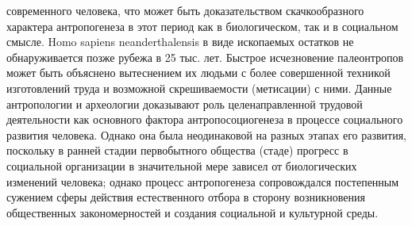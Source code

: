 \documentclass[12pt]{article}
\begin{document}
современного  человека,  что  может  быть  доказательством  скачкообразного  характера  антропогенеза  в  этот
период как в биологическом, так и в социальном смысле. Homo sapiens neanderthalensis в виде ископаемых
остатков не обнаруживается позже рубежа в 25 тыс. лет. Быстрое исчезновение палеонтропов может быть
объяснено  вытеснением  их  людьми  с  более  совершенной  техникой  изготовлений  труда  и  возможной
скрешиваемости (метисации) с ними.
Данные антропологии и археологии доказывают роль целенаправленной трудовой деятельности как основного
фактора антропосоциогенеза в процессе социального развития человека. Однако она была неодинаковой на
разных этапах его развития, поскольку в ранней стадии первобытного общества (стаде) прогресс в социальной
организации в значительной мере зависел от биологических изменений человека; однако процесс антропогенеза
сопровождался  постепенным  сужением  сферы  действия  естественного  отбора  в  сторону  возникновения
общественных закономерностей и создания социальной и культурной среды.

\newpage
\end{document}

